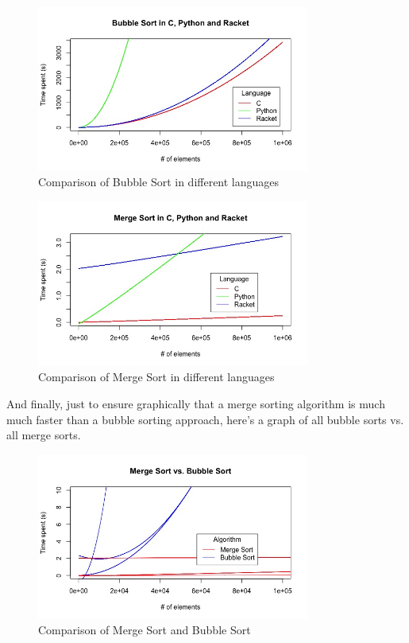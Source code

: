 \documentclass[]{report}
\begin{document}
			\begin{figure}[H]
				\centering
				\includegraphics[width=0.8\textwidth]{resources/visualizations/bubblesortinalllangs.jpeg}
						\caption{Comparison of Bubble Sort in different languages}
			\end{figure}
			
			\begin{figure}[H]
				\centering
				\includegraphics[width=0.8\textwidth]{resources/visualizations/mergesortinalllangs.jpeg}
						\caption{Comparison of Merge Sort in different languages}
			\end{figure}
			
		And finally, just to ensure graphically that a merge sorting algorithm is much much faster than a bubble sorting approach, here's a graph of all bubble sorts vs. all merge sorts.
		
			\begin{figure}[H]
				\centering
				\includegraphics[width=0.8\textwidth]{resources/visualizations/bubblevsmergealllangs.jpeg}
						\caption{Comparison of Merge Sort and Bubble Sort}
			\end{figure}
		
\end{document}
